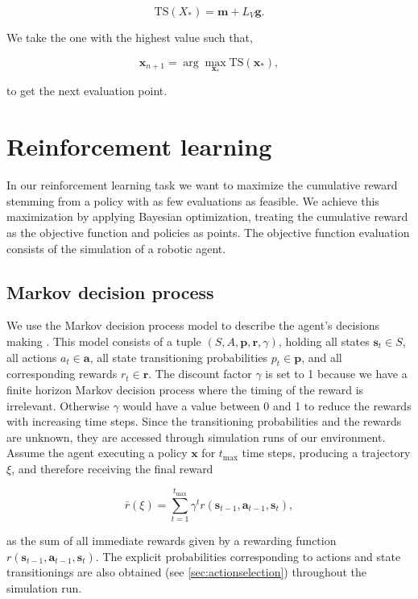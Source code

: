 $$\mathrm{TS}(X_*) = \mathbf{m} + L_V \mathbf{g}.$$

We take the one with the highest value such that,

$$\mathbf{x}_{n+1} = \arg \max_{\mathbf{x}_*} \mathrm{TS}(\mathbf{x}_*),$$

to get the next evaluation point.

\section{Reinforcement learning}

In our reinforcement learning task we want to maximize the cumulative reward stemming from a policy with as few evaluations as feasible. We achieve this maximization by applying Bayesian optimization, treating the cumulative reward as the objective function and policies as points. The objective function evaluation consists of the simulation of a robotic agent.

\subsection{Markov decision process}
We use the Markov decision process model to describe the agent's decisions making \cite{sutton1998reinforcement}. This model consists of a tuple $(S,A,\mathbf{p},\mathbf{r},\gamma)$, holding all states $\mathbf{s}_t \in S$, all actions $a_t \in \mathbf{a}$, all state transitioning probabilities $p_t \in \mathbf{p}$, and all corresponding rewards $r_t \in \mathbf{r}$. The discount factor $\gamma$ is set to 1 because we have a finite horizon Markov decision process where the timing of the reward is irrelevant. Otherwise $\gamma$ would have a value between 0 and 1 to reduce the rewards with increasing time steps. Since the transitioning probabilities and the rewards are unknown, they are accessed through simulation runs of our environment. Assume the agent executing a policy $\mathbf{x}$ for $t_\mathrm{max}$ time steps, producing a trajectory $\xi$, and therefore receiving the final reward

$$\bar{r}(\xi)=\sum_{t=1}^{t_\mathrm{max}} \gamma^t r(\mathbf{s}_{t-1}, \mathbf{a}_{t-1}, \mathbf{s}_{t}),$$

as the sum of all immediate rewards given by a rewarding function $r(\mathbf{s}_{t-1}, \mathbf{a}_{t-1}, \mathbf{s}_{t})$. The explicit probabilities corresponding to actions and state transitionings are also obtained (see \ref{sec:actionselection}) throughout the simulation run.

